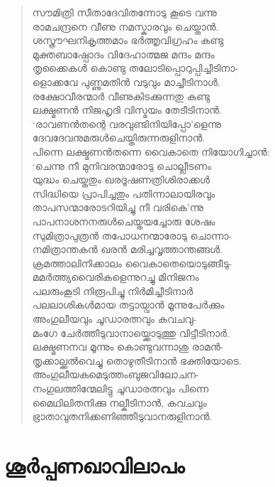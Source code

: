 \begin{verse}
സൗമിത്രി സീതാദേവിതന്നോടു കൂടെ വന്നു\\
രാമചന്ദ്രനെ വീണു നമസ്കാരവും ചെയ്താന്‍.\\
ശസ്ത്രൗഘനികൃത്തമാം ഭര്‍ത്തൃവിഗ്രഹം കണ്ടു\\
മുക്തബാഷ്പോദം വിദേഹാത്മജ മന്ദം മന്ദം\\
തൃക്കൈകള്‍ കൊണ്ടു തലോടിപ്പൊറുപ്പിച്ചീടിനാ-\\
ളൊക്കവേ പുണ്ണുമതിന്‍ വടുവും മാച്ചീടിനാള്‍.\\
രക്ഷോവീരന്മാര്‍ വീണുകിടക്കുന്നതു കണ്ടു\\
ലക്ഷ്മണന്‍ നിജഹൃദി വിസ്മയം തേടീടിനാന്‍.\\
‘രാവണന്‍തന്റെ വരവുണ്ടിനിയിപ്പോ’ളെന്നു\\
ദേവദേവനുമരുള്‍ചെയ്തിരുന്നരുളിനാന്‍.\\
പിന്നെ ലക്ഷ്മണന്‍തന്നെ വൈകാതെ \hbox{നിയോഗിച്ചാന്‍:}\\
‘ചെന്നു നീ മുനിവരന്മാരോടു ചൊല്ലീടണം\\
യുദ്ധം ചെയ്തതും ഖരദൂഷണത്രിശിരാക്കള്‍\\
സിദ്ധിയെ പ്രാപിച്ചതും പതിന്നാലായിരവും\\
താപസന്മാരോടറിയിച്ചു നീ വരികെ’ന്നു\\
പാപനാശനനരുള്‍ചെയ്തയച്ചോരു ശേഷം\\
സുമിത്രാപുത്രന്‍ തപോധനന്മാരോടു ചൊന്നാ-\\
നമിത്രാന്തകന്‍ ഖരന്‍ മരിച്ചവൃത്താന്തങ്ങള്‍.\\
ക്രമത്താലിനിക്കാലം വൈകാതെയൊടുങ്ങീടു-\\
മമര്‍ത്ത്യവൈരികളെന്നുറച്ചു മിനിജനം\\
പലരുംകൂടി നിരൂപിച്ചു നിര്‍മിച്ചീടിനാര്‍\\
പലലാശികള്‍മായ തട്ടായ്വാന്‍ മൂന്നുപേര്‍ക്കും\\
അംഗുലീയവും ചൂഡാരത്നവും കവചവു-\\
മംഗേ ചേര്‍ത്തീടുവാനായ്ക്കൊടുത്തു വിട്ടീടിനാര്‍.\\
ലക്ഷ്മണനവ മൂന്നും കൊണ്ടുവന്നാശു രാമന്‍-\\
തൃക്കാല്ക്കല്‍വെച്ചു തൊഴുതീടിനാന്‍ ഭക്തിയോടെ.\\
അംഗുലീയകമെടുത്തംബുജവിലോചന-\\
നംഗുലത്തിന്മേലിട്ടു ചൂഡാരത്നവും പിന്നെ\\
മൈഥിലിതനിക്കു നല്കീടിനാന്‍, കവചവും\\
ഭ്രാതാവുതനിക്കണിഞ്ഞീടുവാനരുളിനാന്‍.
\end{verse}

\section{ശൂര്‍പ്പണഖാവിലാപം}

